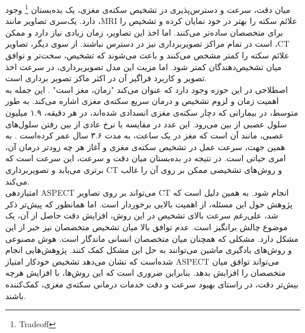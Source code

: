 میان دقت، سرعت و دسترس‌پذیری در تشخیص سکته‌ی مغزی، یک بده‌بستان
\footnote{Tradeoff}
وجود دارد.
یک‌سری تصاویر مانند ،MRI علائم سکته را بهتر در خود نمایان کرده و تشخیص را برای متخصصان ساده‌تر می‌کنند.
اما اخذ این تصاویر، زمان زیادی نیاز دارد و ممکن است در تمام مراکز تصویر‌برداری نیز در دسترس نباشند.
از سوی دیگر، تصاویر ،CT علائم سکته را کمتر مشخص می‌کنند و باعث می‌شوند که تشخیص، سخت‌تر و توافق میان تشخیص‌دهندگان کمتر شود.
اما مزیت این مدل تصویربرداری، در سرعت اخذ تصویر و کاربرد فراگیر آن در اکثر ماکز تصویر برداری است.\\
اصطلاحی در این حوزه وجود دارد که عنوان می‌کند "زمان، مغز است" \cite{saver2006time}.
این جمله به اهمیت زمان و لزوم تشخیص و درمان سریع سکته‌ی مغزی اشاره می‌کند.
به طور متوسط، در بیمارانی که دچار سکته‌ی مغزی انسدادی شده‌اند، در هر دقیقه، ۱.۹ میلیون سلول عصبی از بین می‌رود.
این عدد در مقایسه با نرخ عادی از بین رفتن سلول‌های عصبی، مانند آن است که مغز در یک ساعت، به مدت ۳.۶ سال عمر کرده‌است \cite{saver2006time}.
به همین جهت، سرعت عمل در تشخیص سکته‌ی مغزی و آغاز هر چه زودتر درمان آن، امری حیاتی است.
در نتیجه در بده‌بستان میان دقت و سرعت، این سرعت است که برتری می‌یابد و تصویربرداری CT و روش‌های تشخیصی ممکن بر روی آن را غالب می‌کند.\\
امتیازدهی ASPECT می‌تواند بر روی تصاویر CT انجام شود.
به همین دلیل است که پژوهش حول این مسئله، از اهمیت بالایی برخوردار است.
اما همانطور که پیش‌تر ذکر شد، علی‌رغم سرعت بالای تشخیص در این روش، افزایش دقت حاصل از آن، یک موضوع چالش برانگیز است.
عدم توافق بالا میان تشخیص متخصصان نیز خبر از این مشکل دارد.
مشکلی که همچنان میان متخصصان انسانی ماندگار است.
هوش مصنوعی و روش‌های یادگیری ماشین می‌توانند به حل این مشکل کمک کنند.
پژوهش‌هایی انجام شده‌است \cite{chen2022improving}
که نشان می‌دهد تشخیص خودکار امتیاز ASPECT می‌تواند توافق میان متخصصان را افزایش بدهد.
بنابراین ضروری است که این روش‌ها، با افزایش هرچه بیش‌تر دقت، در راستای بهبود سرعت و دقت خدمات درمانی سکته‌ی مغزی، کمک‌کننده باشند.


